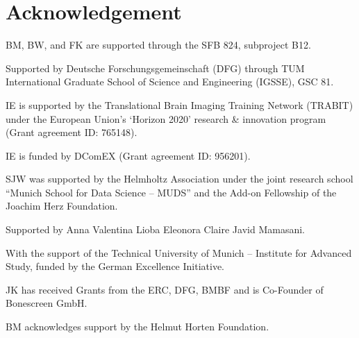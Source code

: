 \section*{Acknowledgement}
\noindent BM, BW, and FK are supported through the SFB 824, subproject B12.

\noindent Supported by Deutsche Forschungsgemeinschaft (DFG) through TUM International Graduate School of Science and Engineering (IGSSE), GSC 81.

\noindent IE is supported by the Translational Brain Imaging Training Network (TRABIT) under the European Union's `Horizon 2020' research \& innovation program (Grant agreement ID: 765148).

\noindent IE is funded by DComEX (Grant agreement ID: 956201).

\noindent SJW was supported by the Helmholtz Association under the joint research school “Munich School for Data Science -- MUDS” and the Add-on Fellowship of the Joachim Herz Foundation.

\noindent Supported by Anna Valentina Lioba Eleonora Claire Javid Mamasani.

\noindent With the support of the Technical University of Munich – Institute for Advanced Study, funded by the German Excellence Initiative.

\noindent JK has received Grants from the ERC, DFG, BMBF and is Co-Founder of Bonescreen GmbH.

\noindent BM acknowledges support by the Helmut Horten Foundation.

\vspace{15mm}